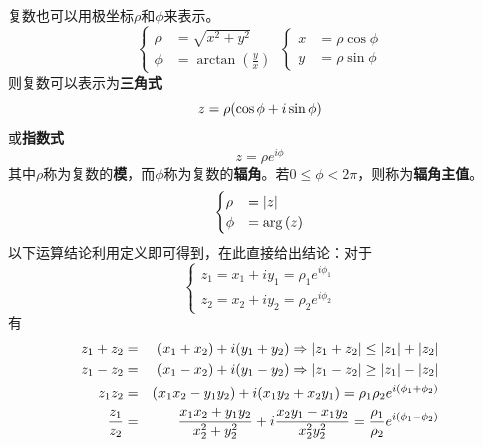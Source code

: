 \documentclass[12pt,a4paper,openany,twoside]{book}
\numberwithin{equation}{section}
\begin{document}
            复数也可以用极坐标$\rho$和$\phi$来表示。
            \begin{equation}
              \begin{cases}
                \rho&=\sqrt{x^2+y^2}\\
                \phi&=\arctan(\frac{y}{x})
              \end{cases}\ \begin{cases}
                x&=\rho\cos\phi\\
                y&=\rho\sin\phi
              \end{cases}
            \end{equation}
            则复数可以表示为\textbf{三角式}
            \begin{equation}
              z=\rho\qty(\cos\phi+i\sin\phi)
            \end{equation}
            或\textbf{指数式}
            \begin{equation}
              z=\rho e^{i\phi}
            \end{equation}
            其中$\rho$称为复数的\textbf{模}，而$\phi$称为复数的\textbf{辐角}。若$0\leq\phi<2\pi$，则称为\textbf{辐角主值}。
            \begin{equation}
              \begin{cases}
                \rho&=\abs{z}\\
                \phi&=\arg\qty(z)
              \end{cases}
            \end{equation}
            以下运算结论利用定义即可得到，在此直接给出结论：对于
            \begin{equation*}
              \begin{cases}
                z_1=x_1+iy_1=\rho_1 e^{i\phi_1}\\
                z_2=x_2+iy_2=\rho_2 e^{i\phi_2}
              \end{cases}
            \end{equation*}
            有
            \begin{eqnarray}
              z_1+z_2&=&\qty(x_1+x_2)+i\qty(y_1+y_2)\Rightarrow\abs{z_1+z_2}\leq\abs{z_1}+\abs{z_2}\\
              z_1-z_2&=&\qty(x_1-x_2)+i\qty(y_1-y_2)\Rightarrow\abs{z_1-z_2}\geq\abs{z_1}-\abs{z_2}\\
              z_1z_2&=&\qty(x_1x_2-y_1y_2)+i\qty(x_1y_2+x_2y_1)=\rho_1\rho_2 e^{i\qty(\phi_1+\phi_2)}\\
              \frac{z_1}{z_2}&=&\frac{x_1x_2+y_1y_2}{x_2^2+y_2^2}+i\frac{x_2y_1-x_1y_2}{x_2^2y_2^2}=\frac{\rho_1}{\rho_2}e^{i\qty(\phi_1-\phi_2)}
            \end{eqnarray}
\end{document}
